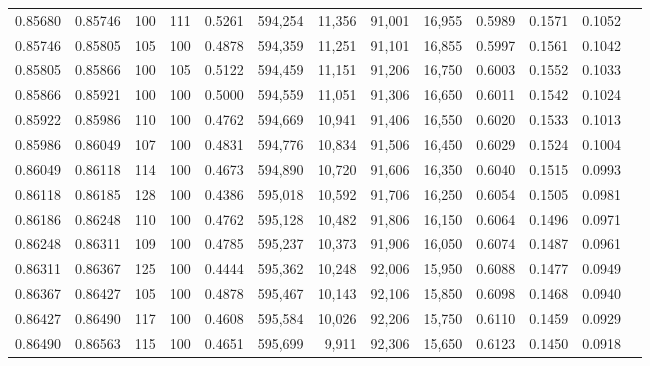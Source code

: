 \begin{tabular}{rrrrrrrrrrrrr}
0.85680 & 0.85746 &   100 & 111 &                                     0.5261 & 594,254 &  11,356 &  91,001 &  16,955 & 0.5989 & 0.1571 & 0.1052 \\
0.85746 & 0.85805 &   105 & 100 &                                     0.4878 & 594,359 &  11,251 &  91,101 &  16,855 & 0.5997 & 0.1561 & 0.1042 \\
0.85805 & 0.85866 &   100 & 105 &                                     0.5122 & 594,459 &  11,151 &  91,206 &  16,750 & 0.6003 & 0.1552 & 0.1033 \\
0.85866 & 0.85921 &   100 & 100 &                                     0.5000 & 594,559 &  11,051 &  91,306 &  16,650 & 0.6011 & 0.1542 & 0.1024 \\
0.85922 & 0.85986 &   110 & 100 &                                     0.4762 & 594,669 &  10,941 &  91,406 &  16,550 & 0.6020 & 0.1533 & 0.1013 \\
0.85986 & 0.86049 &   107 & 100 &                                     0.4831 & 594,776 &  10,834 &  91,506 &  16,450 & 0.6029 & 0.1524 & 0.1004 \\
0.86049 & 0.86118 &   114 & 100 &                                     0.4673 & 594,890 &  10,720 &  91,606 &  16,350 & 0.6040 & 0.1515 & 0.0993 \\
0.86118 & 0.86185 &   128 & 100 &                                     0.4386 & 595,018 &  10,592 &  91,706 &  16,250 & 0.6054 & 0.1505 & 0.0981 \\
0.86186 & 0.86248 &   110 & 100 &                                     0.4762 & 595,128 &  10,482 &  91,806 &  16,150 & 0.6064 & 0.1496 & 0.0971 \\
0.86248 & 0.86311 &   109 & 100 &                                     0.4785 & 595,237 &  10,373 &  91,906 &  16,050 & 0.6074 & 0.1487 & 0.0961 \\
0.86311 & 0.86367 &   125 & 100 &                                     0.4444 & 595,362 &  10,248 &  92,006 &  15,950 & 0.6088 & 0.1477 & 0.0949 \\
0.86367 & 0.86427 &   105 & 100 &                                     0.4878 & 595,467 &  10,143 &  92,106 &  15,850 & 0.6098 & 0.1468 & 0.0940 \\
0.86427 & 0.86490 &   117 & 100 &                                     0.4608 & 595,584 &  10,026 &  92,206 &  15,750 & 0.6110 & 0.1459 & 0.0929 \\
0.86490 & 0.86563 &   115 & 100 &                                     0.4651 & 595,699 &   9,911 &  92,306 &  15,650 & 0.6123 & 0.1450 & 0.0918 \\

\end{tabular}
